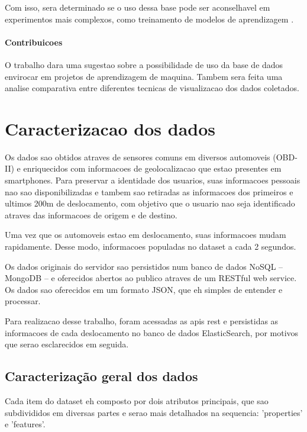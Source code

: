 \documentclass[10pt, conference]{IEEEtran}
\begin{document}
Com isso, sera determinado se o uso dessa base pode ser aconselhavel
em experimentos mais complexos, como 
treinamento de modelos de aprendizagem . 

\paragraph*{Contribuicoes}
%
O trabalho dara uma sugestao sobre a possibilidade de uso da base de dados
envirocar em projetos de aprendizagem de maquina. Tambem sera feita uma
analise comparativa entre diferentes tecnicas de visualizacao dos dados
coletados.


\section{Caracterizacao dos dados}
%

Os dados sao obtidos atraves de sensores comuns em diversos
automoveis (OBD-II) e enriquecidos com informacoes de geolocalizacao
que estao presentes em smartphones. Para preservar a identidade
dos usuarios, suas informacoes pessoais nao sao disponibilizadas e tambem
sao retiradas as informacoes dos primeiros e ultimos 200m de deslocamento,
com objetivo que o usuario nao seja identificado atraves das informacoes
de origem e de destino. 

Uma vez que os automoveis estao em deslocamento, suas informacoes mudam
rapidamente. Desse modo, informacoes populadas no dataset a cada 2 segundos.

Os dados originais do servidor sao persistidos num banco de dados NoSQL -- 
MongoDB -- e oferecidos abertos ao publico atraves de um RESTful web service.
Os dados sao oferecidos em um formato JSON, que eh simples de entender e processar.

Para realizacao desse trabalho, foram acessadas as apis rest e persistidas
as informacoes de cada deslocamento no banco de dados ElasticSearch, por 
motivos que serao esclarecidos em seguida. 



\subsection{Caracterização geral dos dados}

Cada item do dataset eh composto por dois atributos principais, que sao subdivididos
em diversas partes e serao mais detalhados na sequencia: 'properties' e 'features'. 
\end{document}
